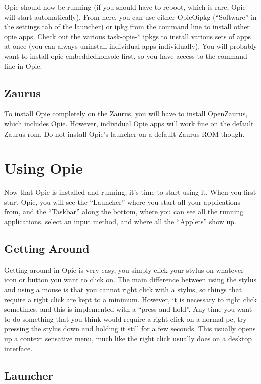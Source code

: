 \documentclass[12pt,letterpaper,oneside, openany]{book} \usepackage[latin1] {inputenc}
\begin{document}
Opie should now be running (if you should have to reboot, which is rare, Opie will start automatically). From here, you can use either OpieOipkg (``Software'' in the settings tab of the launcher) or ipkg from the command line to install other opie apps. Check out the various task-opie-* ipkgs to install various sets of apps at once (you can always uninstall individual apps individually). You will probably want to install opie-embeddedkonsole first, so you have access to the command line in Opie. 

\section{Zaurus}

To install Opie completely on the Zaurus, you will have to install OpenZaurus, which includes Opie. However, individual Opie apps will work fine on the default Zaurus rom. Do not install Opie's launcher on a default Zaurus ROM though.

\chapter{Using Opie}
Now that Opie is installed and running, it's time to start using it.  When you first start Opie, you will see the ``Launcher'' where you start all your applications from, and the ``Taskbar'' along the bottom, where you can see all the running applications, select an input method, and where all the ``Applets'' show up.

\section{Getting Around}

Getting around in Opie is very easy, you simply click your stylus on whatever icon or button you want to click on.  The main difference between using the stylus and using a mouse is that you cannot right click with a stylus, so things that require a right click are kept to a minimum.  However, it is necessary to right click sometimes, and this is implemented with a ``press and hold''.  Any time you want to do something that you think would require a right click on a normal pc, try pressing the stylus down and holding it still for a few seconds.  This usually opens up a context sensative menu, much like the right click usually does on  a desktop interface.

\section{Launcher}
\end{document}
